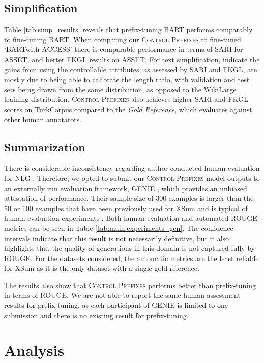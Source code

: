 \documentclass[11pt]{article}
\newcommand{\control}{\textsc{Control Prefixes}\xspace}
\newcommand{\bartl}{BART}
\begin{document}
\subsection{Simplification}

Table \ref{tab:simp_results} reveals that prefix-tuning BART performs comparably to fine-tuning BART. When comparing our \control to fine-tuned ‘\bartl with ACCESS’ there is comparable performance in terms of SARI for ASSET, and better FKGL results on ASSET. For text simplification, \citet{MUSS} indicate the gains from using the controllable attributes, as assessed by SARI and FKGL, are mostly due to being able to calibrate the length ratio, with validation and test sets being drawn from the same distribution, as opposed to the WikiLarge training distribution. 
\control also achieves higher SARI and FKGL scores on TurkCorpus compared to the \emph{Gold Reference}, which evaluates against other human annotators.

\subsection{Summarization}

There is considerable inconsistency regarding author-conducted human evaluation for NLG \citep{vanderlee}. Therefore, we opted to submit our \control model outputs to an externally run evaluation framework, GENIE \citep{GENIE}, which provides an unbiased attestation of performance. Their sample size of 300 examples is larger than the 50 or 100 examples that have been previously used for XSum and is typical of human evaluation experiments \citep{xsum,dou_gsum_2021}.
Both human evaluation and automated ROUGE metrics can be seen in Table \ref{tab:main:experiments_gen}.
The confidence intervals indicate that this result is not necessarily definitive, but it also highlights that the quality of generations in this domain is not captured fully by ROUGE. For the datasets considered, the automatic metrics are the least reliable for XSum as it is the only dataset with a single gold reference. 

The results also show that \control performs better than prefix-tuning in terms of ROUGE. We are not able to report the same human-assessment results for prefix-tuning, as each participant of GENIE is limited to one submission and there is no existing result for prefix-tuning.


\section{Analysis}
\end{document}
